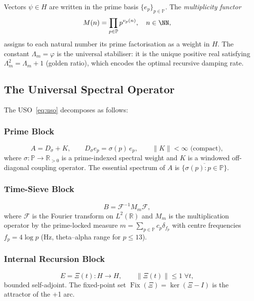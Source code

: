 \documentclass[12pt,a4paper]{article}
\theoremstyle{plain}
\theoremstyle{definition}
\newcommand{\Lambdam}{\Lambda_m}
\newcommand{\PP}{\mathbb{P}}
\newcommand{\RR}{\mathbb{R}}
\begin{document}
\noindent Vectors $\psi \in H$ are written in the prime basis $\{e_p\}_{p \in \PP}$.
The \emph{multiplicity functor}
\begin{equation}
  M(n) = \prod_{p \in \PP} p^{v_p(n)}, \quad n \in \NN,
  \label{eq:multfunctor}
\end{equation}
assigns to each natural number its prime factorisation as a weight in $H$.  The
constant $\Lambdam = \varphi$ is the universal stabiliser: it is the unique positive
real satisfying $\Lambdam^2 = \Lambdam + 1$ (golden ratio), which encodes the
optimal recursive damping rate.

\subsection{The Universal Spectral Operator}
\label{sec:math:uso}

The USO~\eqref{eq:uso} decomposes as follows:

\subsubsection{Prime Block}
\begin{equation}
  A = D_\sigma + K, \qquad
  D_\sigma e_p = \sigma(p)\, e_p, \qquad
  \|K\| < \infty \text{ (compact)},
  \label{eq:primeblock}
\end{equation}
where $\sigma : \PP \to \RR_{>0}$ is a prime-indexed spectral weight and $K$ is a
windowed off-diagonal coupling operator.  The essential spectrum of $A$ is
$\overline{\{\sigma(p) : p \in \PP\}}$.

\subsubsection{Time-Sieve Block}
\begin{equation}
  B = \mathcal{F}^{-1} M_m \mathcal{F},
  \label{eq:timesieve}
\end{equation}
where $\mathcal{F}$ is the Fourier transform on $L^2(\RR)$ and $M_m$ is the
multiplication operator by the prime-locked measure $m = \sum_{p \in \PP} c_p \delta_{f_p}$
with centre frequencies $f_p = 4\log p$ (Hz, theta--alpha range for $p \leq 13$).

\subsubsection{Internal Recursion Block}
\begin{equation}
  E = \Xi(t) : H \to H, \qquad \|\Xi(t)\| \leq 1 \;\forall t,
  \label{eq:recursion}
\end{equation}
bounded self-adjoint.  The fixed-point set $\operatorname{Fix}(\Xi) = \ker(\Xi - I)$
is the attractor of the +1 arc.
\end{document}
